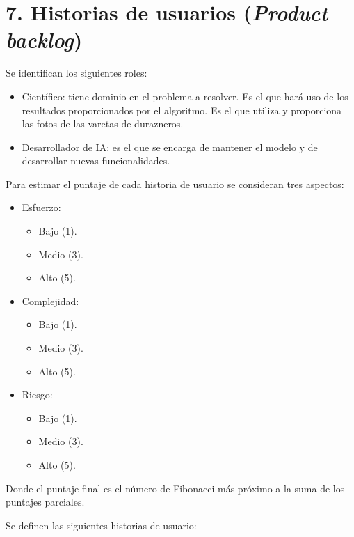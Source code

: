 \documentclass[
11pt, %
]{charter}
\begin{document}
\section{7. Historias de usuarios (\textit{Product backlog})}
\label{sec:backlog}

Se identifican los siguientes roles:

\begin{itemize}
	\item Científico: tiene dominio en el problema a resolver. Es el que hará uso de los resultados proporcionados por el algoritmo. Es el que utiliza y proporciona las fotos de las varetas de durazneros. 
	\item Desarrollador de IA: es el que se encarga de mantener el modelo y de desarrollar nuevas funcionalidades.
\end{itemize}

Para estimar el puntaje de cada historia de usuario se consideran tres aspectos:

\begin{itemize}
	\item Esfuerzo:
	\begin{itemize}
	\item Bajo (1). 
	\item Medio (3). 
	\item Alto (5).
\end{itemize}
	\item Complejidad: 
	\begin{itemize}
	\item Bajo (1).
	\item Medio (3). 
	\item Alto (5).
\end{itemize}
	\item Riesgo:
	\begin{itemize}
	\item Bajo (1). 
	\item Medio (3). 
	\item Alto (5).
\end{itemize}
\end{itemize}

Donde el puntaje final es el número de Fibonacci más próximo a la suma de los puntajes parciales.

Se definen las siguientes historias de usuario:
\end{document}
